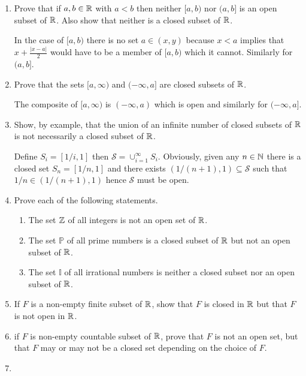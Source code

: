 \documentclass[10pt,a4paper]{report}
\begin{document}
\begin{enumerate}

\item Prove that if $a,b \in \mathbb{R}$ with $a < b$ then neither $[a,b)$ nor $(a,b]$ is an open subset of $\mathbb{R}$.  Also show that neither is a closed subset of $\mathbb{R}$.

In the case of $[a,b)$ there is no set $a \in (x,y)$ because $x < a$ implies that $x+\frac{|x-a|}{2}$ would have to be a member of $[a,b)$ which it cannot.  Similarly for $(a,b]$.

\item Prove that the sets $[a,\infty)$ and $(-\infty, a]$ are closed subsets of $\mathbb{R}$.

The composite of $[a,\infty)$ is $(-\infty, a)$ which is open and similarly for $(-\infty, a]$.

\item Show, by example, that the union of an infinite number of closed subsets of $\mathbb{R}$ is not necessarily a closed subset of $\mathbb{R}$.

Define $S_i = [1/i, 1]$ then $\mathcal{S} = \cup_{i=1}^\infty S_i$.  Obviously, given any $n \in \mathbb{N}$ there is a closed set $S_n=[1/n, 1]$ and there exists $(1/(n+1),1) \subseteq \mathcal{S}$ such that $1/n \in  (1/(n+1),1)$ hence $\mathcal{S}$ must be open.

\item Prove each of the following statements.
\begin{enumerate}[label=(\roman*)]
	\item The set $\mathbb{Z}$ of all integers is not an open set of $\mathbb{R}$.
	\item The set $\mathbb{P}$ of all prime numbers is a closed subset of $\mathbb{R}$ but not an open subset of $\mathbb{R}$.
	\item The set $\mathbb{I}$ of all irrational numbers is neither a closed subset nor an open subset of $\mathbb{R}$.
\end{enumerate}

\item If $F$ is a non-empty finite subset of $\mathbb{R}$, show that $F$ is closed in $\mathbb{R}$ but that $F$ is not open in $\mathbb{R}$.

\item if $F$ is non-empty countable subset of $\mathbb{R}$, prove that $F$ is not an open set, but that $F$ may or may not be a closed set depending on the choice of $F$.

\item \begin{enumerate}[label=(\roman*)]


\end{enumerate}
\end{enumerate}
\end{document}

